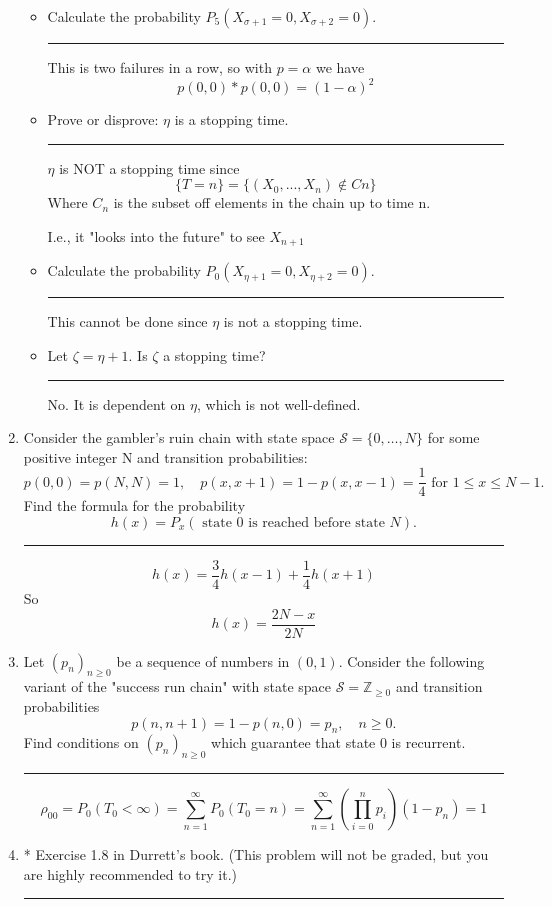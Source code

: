 \documentclass{article} %
\theoremstyle{plain}
\theoremstyle{case}
\begin{document}
\begin{enumerate}[label={\fbox{\textbf{Exercise \#\arabic* :}}}]
\begin{itemize}
	\item  Calculate the probability $P_5\left(X_{\sigma+1}=0, X_{\sigma+2}=0\right)$.
\par\noindent\rule{\textwidth}{0.1pt}
      This is two failures in a row, so with $p = \alpha$ we have
      \[ p(0,0) * p(0,0) = (1 - \alpha)^2 \]
	\item  Prove or disprove: $\eta$ is a stopping time.
\par\noindent\rule{\textwidth}{0.1pt}
      $\eta$ is NOT a stopping time since 
     \[ \{T = n\} = \{(X_0,...,X_n) \notin Cn \} \]
      Where $C_n$ is the subset off elements in the chain up to time n.

      I.e., it "looks into the future" to see $X_{n+1}$
	\item  Calculate the probability $P_0\left(X_{\eta+1}=0, X_{\eta+2}=0\right)$.
\par\noindent\rule{\textwidth}{0.1pt}
      This cannot be done since $\eta$ is not a stopping time.
	\item  Let $\zeta=\eta+1$. Is $\zeta$ a stopping time?
\par\noindent\rule{\textwidth}{0.1pt}
      No.  It is dependent on $\eta$, which is not well-defined.
  \end{itemize}

\newpage

  \item Consider the gambler's ruin chain with state space $\mathcal{S}=\{0, \ldots, N\}$ for some positive integer $\mathrm{N}$ and transition probabilities:
$$
p(0,0)=p(N, N)=1, \quad p(x, x+1)=1-p(x, x-1)=\frac{1}{4} \text { for } 1 \leq x \leq N-1 .
$$
Find the formula for the probability
$$
h(x)=P_x(\text { state } 0 \text { is reached before state } N) .
$$
\par\noindent\rule{\textwidth}{0.1pt}

  \[ h(x) = \frac{3}{4} h(x-1) + \frac{1}{4} h(x+1) \]
  So
  \[ h(x) = \frac{2N - x}{2N} \]

\newpage

  \item Let $\left(p_n\right)_{n \geq 0}$ be a sequence of numbers in $(0,1)$. Consider the following variant of the "success run chain" with state space $\mathcal{S}=\mathbb{Z}_{\geq 0}$ and transition probabilities
$$
p(n, n+1)=1-p(n, 0)=p_n, \quad n \geq 0 .
$$
Find conditions on $\left(p_n\right)_{n \geq 0}$ which guarantee that state 0 is recurrent.
\par\noindent\rule{\textwidth}{0.1pt}

  \[
    \rho_{00} = P_0(T_0 < \infty) = \sum^{\infty}_{n=1} P_0(T_0=n)
    = \sum^{\infty}_{n=1} \left( \prod_{i=0}^{n} p_{i}\right) (1 - p_n) = 1
  \]

\newpage

  \item * Exercise 1.8 in Durrett's book. (This problem will not be graded, but you are highly recommended to try it.)
\par\noindent\rule{\textwidth}{0.1pt}

\end{enumerate}
\end{document}
